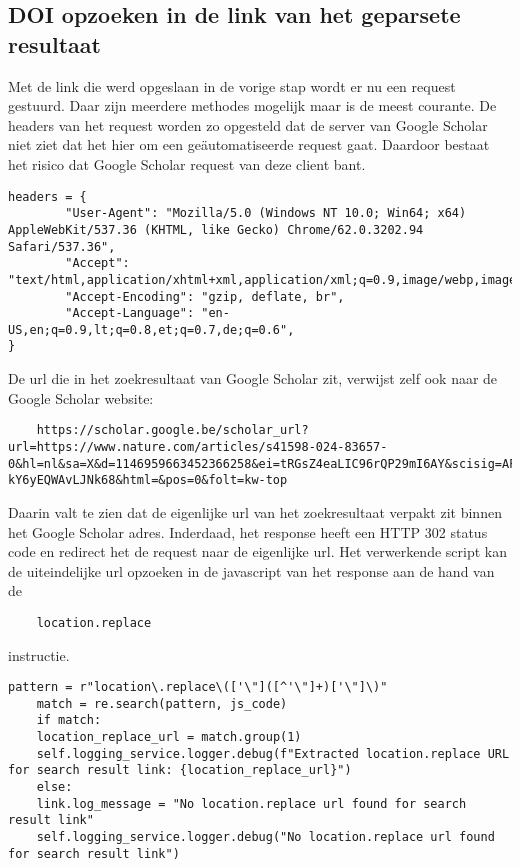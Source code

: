 \subsection{DOI opzoeken in de link van het geparsete resultaat}
Met de link die werd opgeslaan in de vorige stap wordt er nu een request gestuurd. Daar zijn meerdere methodes mogelijk maar \textcite{Requests2025} is de meest courante. De headers van het request worden zo opgesteld dat de server van Google Scholar niet ziet dat het hier om een geäutomatiseerde request gaat. Daardoor bestaat het risico dat Google Scholar request van deze client bant.
\begin{lstlisting}headers = {
        "User-Agent": "Mozilla/5.0 (Windows NT 10.0; Win64; x64) AppleWebKit/537.36 (KHTML, like Gecko) Chrome/62.0.3202.94 Safari/537.36",
        "Accept": "text/html,application/xhtml+xml,application/xml;q=0.9,image/webp,image/apng,*/*;q=0.8",
        "Accept-Encoding": "gzip, deflate, br",
        "Accept-Language": "en-US,en;q=0.9,lt;q=0.8,et;q=0.7,de;q=0.6",
}\end{lstlisting}
De url die in het zoekresultaat van Google Scholar zit, verwijst zelf ook naar de Google Scholar website:
\begin{lstlisting}
    https://scholar.google.be/scholar_url?url=https://www.nature.com/articles/s41598-024-83657-0&hl=nl&sa=X&d=1146959663452366258&ei=tRGsZ4eaLIC96rQP29mI6AY&scisig=AFWwaeY6TmkYbZVI8aTe6GErndZI&oi=scholaralrt&hist=P_QG1LwAAAAJ:2727769339669043622:AFWwaeYuVCLO-kY6yEQWAvLJNk68&html=&pos=0&folt=kw-top
\end{lstlisting}
Daarin valt te zien dat de eigenlijke url van het zoekresultaat verpakt zit binnen het Google Scholar adres.
Inderdaad, het response heeft een HTTP 302 status code en redirect het de request naar de eigenlijke url.
Het verwerkende script kan de uiteindelijke url opzoeken in de javascript van het response aan de hand van de \begin{verbatim}
    location.replace
\end{verbatim} instructie.
\begin{lstlisting}pattern = r"location\.replace\(['\"]([^'\"]+)['\"]\)"
    match = re.search(pattern, js_code)
    if match:
    location_replace_url = match.group(1)
    self.logging_service.logger.debug(f"Extracted location.replace URL for search result link: {location_replace_url}")
    else:
    link.log_message = "No location.replace url found for search result link"
    self.logging_service.logger.debug("No location.replace url found for search result link")
    
 \end{lstlisting}
